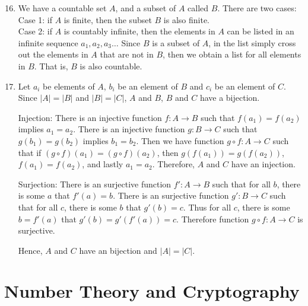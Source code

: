 \documentclass{article}
\begin{document}
\begin{enumerate}
    \setcounter{enumi}{15}
    \item We have a countable set $A$, and a subset of $A$ called $B$. There are two cases:\\
    Case 1: if $A$ is finite, then the subset $B$ is also finite.\\
    Case 2: if $A$ is countably infinite, then the elements in $A$ can be listed in an infinite sequence $a_1,a_2,a_3 \dots$ Since $B$ is a subset of $A$, in the list simply cross out the elements in $A$ that are not in $B$, then we obtain a list for all elements in $B$. That is, $B$ is also countable.
    
    
    \setcounter{enumi}{19}
    \item Let $a_i$ be elements of $A$, $b_i$ be an element of $B$ and $c_i$ be an element of $C$. Since $|A| = |B|$ and $|B| = |C|$, $A$ and $B$, $B$ and $C$ have a bijection.
    
    Injection: There is an injective function $f: A \rightarrow B$ such that $f(a_1) = f(a_2)$ implies $a_1 = a_2$. There is an injective function $g: B \rightarrow C$ such that $g(b_1) = g(b_2)$ implies $b_1 = b_2$. Then we have function $g \circ f: A \rightarrow C$ such that if $(g \circ f)(a_1) = (g \circ f)(a_2)$, then $g(f(a_1)) = g(f(a_2))$, $f(a_1) = f(a_2)$, and lastly $a_1 = a_2$. Therefore, $A$ and $C$ have an injection.
    
    Surjection: There is an surjective function $f': A \rightarrow B$ such that for all $b$, there is some $a$ that $f'(a) = b$. There is an surjective function $g': B \rightarrow C$ such that for all $c$, there is some $b$ that $g'(b) = c$. Thus for all $c$, there is some $b = f'(a)$ that $g'(b) = g'(f'(a)) = c$. Therefore function $g \circ f: A \rightarrow C$ is surjective.
    
    Hence, $A$ and $C$ have an bijection and $|A| = |C|$.
\end{enumerate}
\setcounter{section}{3}
\section{Number Theory and Cryptography}
\end{document}

